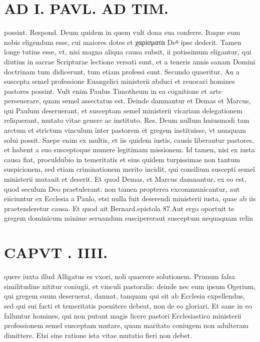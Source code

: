 \documentclass{article}
\begin{document}
\begin{pages}
\section*{AD I. PAVL. AD TIM. }
\marginpar{[ p.202 ]}\pstart possint. Respond. Deum quidem in quem vult dona sua conferre. Itaque eum nobis eligendum esse, cui maiores dotes et χαρίσματα Deꝰ ipse dederit. Tamen longe tutius esse, vt, nisi magna aliqua causa subsit, ii potissimum eligantur, qui diutius in sacrae Scripturae lectione versati sunt, et a teneris annis sanam Domini doctrinam tum didicerunt, tum etiam professi sunt. Secundo quaeritur, An a suscepta semel professione Euangelici ministerii abduci et reuocari homines pastores possint. Vult enim Paulus Timotheum in ea cognitione et arte perseuerare, quam semel assectatus est. Deinde damnantur et Demas et Marcus, qui Paulum deseruerant, et susceptam semel ministerii vicariam delegationem reliquerant, mutato vitae genere ac instituto. Res. Deum nullum huiusmodi tam arctum et strictum vinculum inter pastorem et gregem instituisse, vt nunquam solui possit. Saepe enim ex multis, et iis quidem iustis, causis liberantur pastores, et habent a suo susceptoque munere legitimam missionem. Id tamen, nisi ex iusta causa fiat, proculdubio in temeritatis et eius quidem turpissimae non tantum suspicionem, sed etiam criminationem merito incidit, qui consilium suscepti semel ministerii mutauit et deserit. Et quod Demas, et Marcus damnantur, ex eo est, quod seculum Deo praetulerant: non tamen propterea excommunicantur, aut eiiciuntur ex Ecclesia a Paulo, etsi nulla fuit deserendi ministerii iusta, quae ab iis praetenderetur causa. Et quod ait Bernard.epistola 87.Aut ergo oportuit te gregem dominicum minime seruandum suscipereraut susceptum nequaquam relin\pend
\section*{CAPVT . IIII. }
\marginpar{[ p.293 ]}\pstart quere iuxta illud Alligatus es vxori, noli quaerere solutionem. Primum falsa similitudine nititur coniugii, et vinculi pastoralis: deinde nec eum ipsum Ogerium, qui gregem suum deseruerat, dannat, tanquam qui sit ab Ecclesia expellendus, sed qui sui facti et temeritatis poenitere debeat, non de eo gloriari. Et sane in eo falluntur homines, qui non putant magis licere pastori Ecclesiastico ministerii professionem semel susceptam mutare, quam maritato coniugem non adulteram dimittere. Etsi sine ratione ista vitae mutatio fieri non debet.  \pend\pstart {}
{}

\end{pages}
\end{document}
